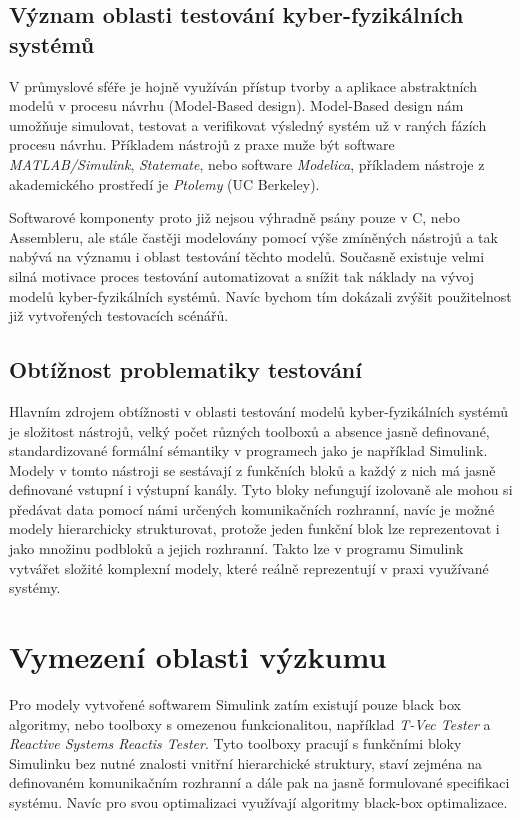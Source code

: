 \documentclass[conference,a4paper]{IEEEtran-CZ}
\begin{document}
\subsection{Význam oblasti testování kyber-fyzikálních systémů}

V průmyslové sféře je hojně využíván přístup tvorby a aplikace abstraktních modelů 
v procesu návrhu (Model-Based design\cite{Jensen:MBD:2011}).
Model-Based design nám umožňuje simulovat, testovat a verifikovat výsledný systém 
už v raných fázích procesu návrhu. Příkladem nástrojů z praxe muže být software 
\emph{MATLAB/Simulink}, \emph{Statemate}, nebo software \emph{Modelica}, příkladem nástroje z 
akademického prostředí je \emph{Ptolemy} (UC Berkeley).

Softwarové komponenty proto již nejsou výhradně psány pouze v C, nebo Assembleru,
ale stále častěji modelovány pomocí výše zmíněných nástrojů a tak nabývá na významu
i oblast testování těchto modelů\cite{Bringmann:MBT:2008}. Současně existuje 
velmi silná motivace proces testování automatizovat a snížit tak náklady na vývoj modelů 
kyber-fyzikálních systémů. Navíc bychom tím dokázali zvýšit použitelnost již vytvořených 
testovacích scénářů.

\subsection{Obtížnost problematiky testování}

Hlavním zdrojem obtížnosti v oblasti testování modelů kyber-fyzikálních systémů je složitost nástrojů,
velký počet různých toolboxů a absence jasně definované, standardizované formální sémantiky v 
programech jako je například Simulink. Modely v tomto nástroji se sestávají z funkčních bloků
a každý z nich má jasně definované vstupní i výstupní kanály. Tyto bloky nefungují
izolovaně ale mohou si předávat data pomocí námi určených komunikačních rozhranní,
navíc je možné modely hierarchicky strukturovat, protože jeden funkční blok lze reprezentovat
i jako množinu podbloků a jejich rozhranní. Takto lze v programu Simulink vytvářet složité
komplexní modely, které reálně reprezentují v praxi využívané systémy.

\section{Vymezení oblasti výzkumu}

Pro modely vytvořené softwarem Simulink zatím existují pouze black box algoritmy, nebo
toolboxy s omezenou funkcionalitou, například \emph{T-Vec Tester} a 
\emph{Reactive Systems Reactis Tester}\cite{Blackburn:1996,Sims:2007}.
Tyto toolboxy pracují s funkčními bloky Simulinku bez nutné znalosti vnitřní hierarchické struktury,
staví zejména na definovaném komunikačním rozhranní a dále pak na jasně formulované
specifikaci systému. Navíc pro svou optimalizaci využívají algoritmy black-box 
optimalizace\cite{Gendreau:2010}. 
\end{document}
